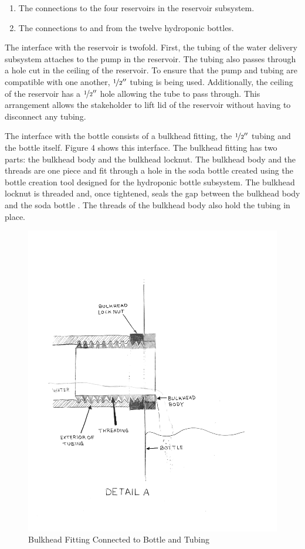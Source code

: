 \documentclass[12pt]{article}
\begin{document}
\begin{enumerate}
    \item The connections to the four reservoirs in the reservoir subsystem.
    \item The connections to and from the twelve hydroponic bottles.
\end{enumerate}

The interface with the reservoir is twofold. First, the tubing of the water delivery subsystem
attaches to the pump in the reservoir. The tubing also passes through a hole cut in the ceiling of
the reservoir. To ensure that the pump and tubing are compatible with one another,
$\nicefrac{1}{2}''$ tubing is being used. Additionally, the ceiling of the reservoir has a
$\nicefrac{1}{2}''$ hole allowing the tube to pass through. This arrangement allows the stakeholder
to lift lid of the reservoir without having to disconnect any tubing.

The interface with the bottle consists of a bulkhead fitting, the $\nicefrac{1}{2}''$ tubing and the
bottle itself. Figure 4 shows this interface. The bulkhead fitting has two parts: the bulkhead
body and the bulkhead locknut. The bulkhead body and the threads are one piece and fit through a
hole in the soda bottle created using the bottle creation tool designed for the hydroponic bottle
subsystem. The bulkhead locknut is threaded and, once tightened, seals the gap between the bulkhead
body and the soda bottle \cite{uspc}. The threads of the bulkhead body also hold the tubing in
place.

\begin{figure}[H]
    \centering
    \includegraphics[width=163mm]{resources/detail-a.png}
    \caption{Bulkhead Fitting Connected to Bottle and Tubing}
\end{figure}
\end{document}
